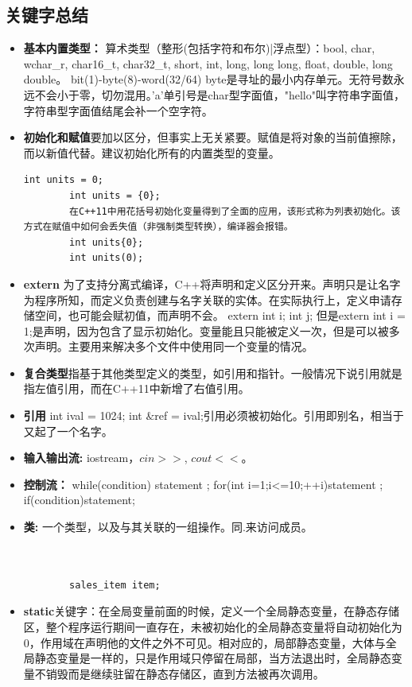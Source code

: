 \subsection{关键字总结}
\begin{itemize}
	\item \textbf{基本内置类型：} 算术类型（整形(包括字符和布尔)|浮点型）：bool, char, wchar\_r, char16\_t, char32\_t, short, int, long, long long, float, double, long double。 bit(1)-byte(8)-word(32/64) byte是寻址的最小内存单元。无符号数永远不会小于零，切勿混用。'a'单引号是char型字面值，"hello"叫字符串字面值，字符串型字面值结尾会补一个空字符。
	\item \textbf{初始化和赋值}要加以区分，但事实上无关紧要。赋值是将对象的当前值擦除，而以新值代替。建议初始化所有的内置类型的变量。
	\begin{lstlisting}[caption={}]
		int units = 0;
		int units = {0};
		在C++11中用花括号初始化变量得到了全面的应用，该形式称为列表初始化。该方式在赋值中如何会丢失值（非强制类型转换），编译器会报错。
		int units{0}; 
		int units(0);
	\end{lstlisting}
	\item \textbf{extern} 为了支持分离式编译，C++将声明和定义区分开来。声明只是让名字为程序所知，而定义负责创建与名字关联的实体。在实际执行上，定义申请存储空间，也可能会赋初值，而声明不会。 extern int i; int j; 但是extern int i = 1;是声明，因为包含了显示初始化。变量能且只能被定义一次，但是可以被多次声明。主要用来解决多个文件中使用同一个变量的情况。
	\item \textbf{复合类型}指基于其他类型定义的类型，如引用和指针。一般情况下说引用就是指左值引用，而在C++11中新增了右值引用。
	\item \textbf{引用} int ival = 1024; int $\&$ref = ival;引用必须被初始化。引用即别名，相当于又起了一个名字。
	
	
	
	\item \textbf{输入输出流:} iostream，$cin >>$, $cout <<$。
	\item \textbf{控制流：} while(condition) {statement} ; for(int i=1;i<=10;++i){statement} ; if(condition){statement};
	\item \textbf{类:} 一个类型，以及与其关联的一组操作。同.来访问成员。
	\begin{lstlisting}[caption={}]
		
		
		sales_item item;
	\end{lstlisting}
	
	
	
	  
	\item \textbf{static}关键字：在全局变量前面的时候，定义一个全局静态变量，在静态存储区，整个程序运行期间一直存在，未被初始化的全局静态变量将自动初始化为0，作用域在声明他的文件之外不可见。相对应的，局部静态变量，大体与全局静态变量是一样的，只是作用域只停留在局部，当方法退出时，全局静态变量不销毁而是继续驻留在静态存储区，直到方法被再次调用。
\end{itemize}

